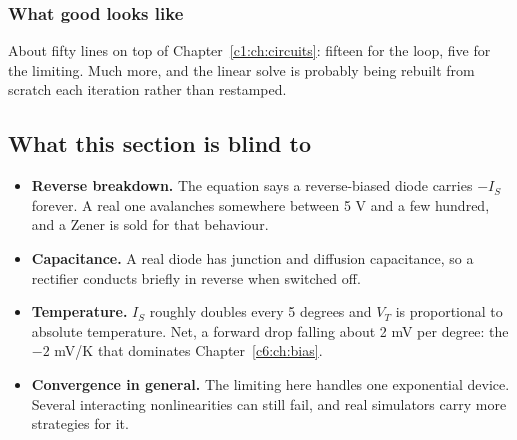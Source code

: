 \subsubsection{What good looks like}
About fifty lines on top of Chapter~\ref{c1:ch:circuits}: fifteen for the loop, five for the limiting. Much more, and the linear solve is probably being rebuilt from scratch each iteration rather than restamped.

\subsection{What this section is blind to}
\label{c4:sec:b6}
\begin{itemize}
  \item \textbf{Reverse breakdown.} The equation says a reverse-biased diode carries $-I_S$ forever. A real one avalanches somewhere between 5 V and a few hundred, and a Zener is sold for that behaviour.
  \item \textbf{Capacitance.} A real diode has junction and diffusion capacitance, so a rectifier conducts briefly in reverse when switched off.
  \item \textbf{Temperature.} $I_S$ roughly doubles every 5 degrees and $V_T$ is proportional to absolute temperature. Net, a forward drop falling about 2 mV per degree: the $-2$ mV/K that dominates Chapter~\ref{c6:ch:bias}.
  \item \textbf{Convergence in general.} The limiting here handles one exponential device. Several interacting nonlinearities can still fail, and real simulators carry more strategies for it.
\end{itemize}
